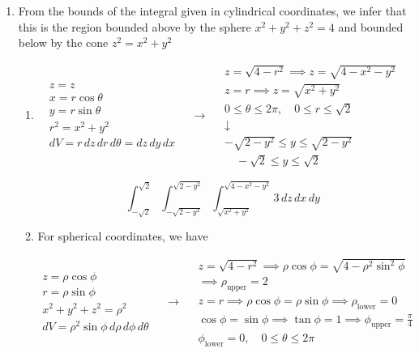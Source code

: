 \documentclass[a4paper, 12pt]{article}
\begin{document}
\begin{enumerate}[leftmargin=*,label=\textbf{\arabic*.}]
\item From the bounds of the integral given in cylindrical coordinates, we infer that this is the region bounded above by the sphere $x^2+y^2+z^2=4$ and bounded below by the cone $z^2=x^2+y^2$ 
\begin{enumerate}[leftmargin=*,label=\textbf{\alph*.}]
\item\leavevmode
\vspace{-1.5em}
\[
\begin{array}{c}
z=z\\
x=r\cos\theta\\
y=r\sin\theta\\
r^2=x^2+y^2\\
dV=r\,dz\,dr\,d\theta=dz\,dy\,dx
\end{array}\quad\rightarrow\quad
\begin{array}{c}
z=\sqrt{4-r^2}\implies z=\sqrt{4-x^2-y^2}\\
z=r\implies z=\sqrt{x^2+y^2}\\[1em]
0\leq\theta\leq2\pi,\quad 0\leq r\leq\sqrt2\\[0.2cm]
\downarrow\\[0.2cm]
-\sqrt{2-y^2}\leq y\leq\sqrt{2-y^2}\\\quad -\sqrt2\leq y\leq\sqrt2
\end{array}
\]

\[\boxed{\int_{-\sqrt2}^{\sqrt2}\int_{-\sqrt{2-y^2}}^{\sqrt{2-y^2}}\int_{\sqrt{x^2+y^2}}^{\sqrt{4-x^2-y^2}}3\,dz\,dx\,dy}\]

\item For spherical coordinates, we have

\[
\begin{array}{c}
z=\rho\cos\phi\\
r=\rho\sin\phi\\
x^2+y^2+z^2=\rho^2\\
dV=\rho^2\sin\phi\,d\rho\,d\phi\,d\theta
\end{array}\quad\rightarrow\quad
\begin{array}{c}
z=\sqrt{4-r^2}\implies\rho\cos\phi=\sqrt{4-\rho^2\sin^2\phi}\\\implies\rho_{\text{upper}}=2\\
z=r\implies\rho\cos\phi=\rho\sin\phi\implies\rho_{\text{lower}}=0\\[1em]
\displaystyle\cos\phi=\sin\phi\implies\tan\phi=1\implies\phi_{\text{upper}}=\frac\pi4\\
\phi_{\text{lower}}=0,\quad 0\leq\theta\leq2\pi
\end{array}
\]


\end{enumerate}
\end{enumerate}
\end{document}
